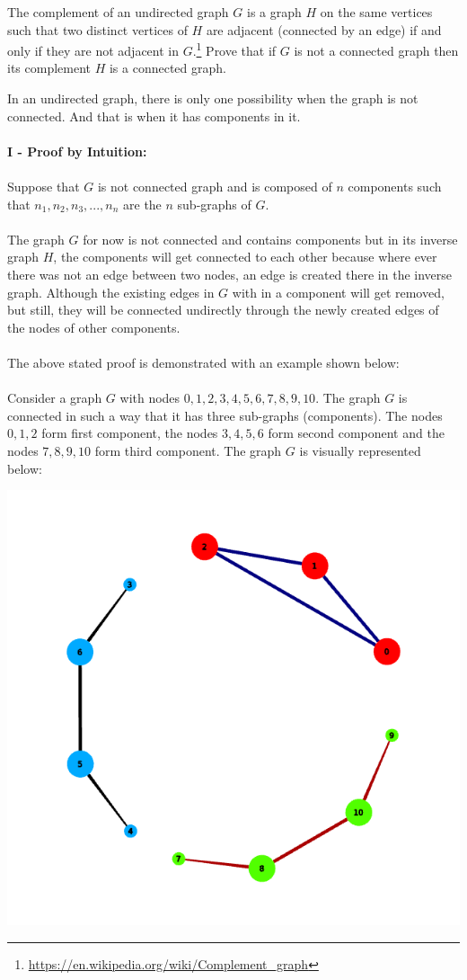 \documentclass[addpoints]{exam}
\begin{document}
\begin{questions}
  The complement of an undirected graph $G$ is a graph $H$ on the same vertices such that two distinct vertices of $H$ are adjacent (connected by an edge) if and only if they are not adjacent in $G$.\footnote{\url{https://en.wikipedia.org/wiki/Complement_graph}} Prove that if $G$ is not a connected graph then its complement $H$ is a connected graph.
  \begin{solution}
  	In an undirected graph, there is only one possibility when the graph is not connected. And that is when it has components in it.\\ \\ 
  	\textbf{{I - Proof by Intuition:}} \\ \\
	Suppose that $G$ is not connected graph and is composed of $n$ components such that $n_1, n_2, n_3, ..., n_n$ are the $n$ sub-graphs of $G$. \\ \\
	The graph $G$ for now is not connected and contains components but in its inverse graph $H$, the components will get connected to each other because where ever there was not an edge between two nodes, an edge is created there in the inverse graph. Although the existing edges in $G$ with in a component will get removed, but still, they will be connected undirectly through the newly created edges of the nodes of other components. \\ \\
	The above stated proof is demonstrated with an example shown below: \\ \\ Consider a graph $G$ with nodes $0, 1, 2, 3, 4, 5, 6, 7, 8, 9, 10$. The graph $G$ is connected in such a way that it has three sub-graphs (components). The nodes $0, 1, 2$ form first component, the nodes $3, 4, 5, 6$ form second component and the nodes $7, 8, 9, 10$ form third component. The graph $G$ is visually represented below: 
	\begin{center}
		\includegraphics[scale=0.5]{original_graph_2}\\

\end{center}
\end{solution}
\end{questions}
\end{document}
